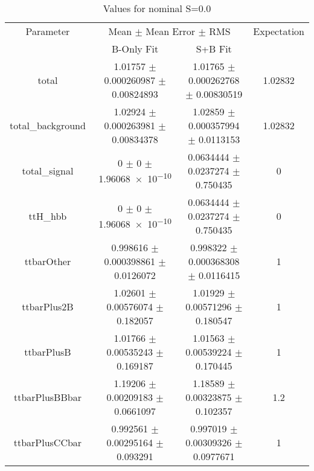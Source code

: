 \begin{table}
\centering
\caption{Values for nominal S=0.0}
\begin{tabular}{cccc}
\toprule
Parameter & \multicolumn{2}{c}{Mean $\pm$ Mean Error $\pm$ RMS} & Expectation\\
 & B-Only Fit & S+B Fit & \\
\midrule
total & \num{1.01757} $\pm$ \num{0.000260987} $\pm$ \num{0.00824893} & \num{1.01765} $\pm$ \num{0.000262768} $\pm$ \num{0.00830519} & \num{1.02832}\\
total\_background & \num{1.02924} $\pm$ \num{0.000263981} $\pm$ \num{0.00834378} & \num{1.02859} $\pm$ \num{0.000357994} $\pm$ \num{0.0113153} & \num{1.02832}\\
total\_signal & \num{0} $\pm$ \num{0} $\pm$ \num{1.96068e-10} & \num{0.0634444} $\pm$ \num{0.0237274} $\pm$ \num{0.750435} & \num{0}\\
ttH\_hbb & \num{0} $\pm$ \num{0} $\pm$ \num{1.96068e-10} & \num{0.0634444} $\pm$ \num{0.0237274} $\pm$ \num{0.750435} & \num{0}\\
ttbarOther & \num{0.998616} $\pm$ \num{0.000398861} $\pm$ \num{0.0126072} & \num{0.998322} $\pm$ \num{0.000368308} $\pm$ \num{0.0116415} & \num{1}\\
ttbarPlus2B & \num{1.02601} $\pm$ \num{0.00576074} $\pm$ \num{0.182057} & \num{1.01929} $\pm$ \num{0.00571296} $\pm$ \num{0.180547} & \num{1}\\
ttbarPlusB & \num{1.01766} $\pm$ \num{0.00535243} $\pm$ \num{0.169187} & \num{1.01563} $\pm$ \num{0.00539224} $\pm$ \num{0.170445} & \num{1}\\
ttbarPlusBBbar & \num{1.19206} $\pm$ \num{0.00209183} $\pm$ \num{0.0661097} & \num{1.18589} $\pm$ \num{0.00323875} $\pm$ \num{0.102357} & \num{1.2}\\
ttbarPlusCCbar & \num{0.992561} $\pm$ \num{0.00295164} $\pm$ \num{0.093291} & \num{0.997019} $\pm$ \num{0.00309326} $\pm$ \num{0.0977671} & \num{1}\\
\bottomrule
\end{tabular}
\end{table}